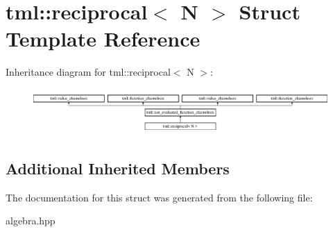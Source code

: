 \hypertarget{structtml_1_1reciprocal}{\section{tml\+:\+:reciprocal$<$ N $>$ Struct Template Reference}
\label{structtml_1_1reciprocal}
}
Inheritance diagram for tml\+:\+:reciprocal$<$ N $>$\+:\begin{figure}[H]
\begin{center}
\leavevmode
\includegraphics[height=1.750000cm]{structtml_1_1reciprocal}
\end{center}
\end{figure}
\subsection*{Additional Inherited Members}


The documentation for this struct was generated from the following file\+:\begin{DoxyCompactItemize}
\item 
algebra.\+hpp\end{DoxyCompactItemize}
